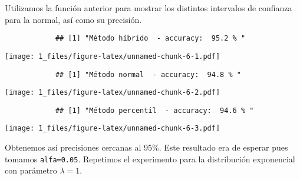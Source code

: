 \documentclass[a4paper]{article}
\begin{document}
\begin{Shaded}
\begin{Highlighting}[]
{{				
				\StringTok{ }\OperatorTok{==}\NormalTok{) }  
				\NormalTok{\}}
			\end{Highlighting}
		\end{Shaded}
		
		Utilizamos la función anterior para mostrar los distintos intervalos de
		confianza para la normal, así como su precisión.
		
		\begin{Shaded}
			\begin{Highlighting}[]
				\NormalTok{(}\NormalTok{)}
				
				\StringTok{ }\NormalTok{(}\NormalTok{, }\NormalTok{, }\NormalTok{)}
				\NormalTok{(}
				\NormalTok{\}}
			\end{Highlighting}
		\end{Shaded}
		
		\begin{verbatim}
			## [1] "Método híbrido  - accuracy:  95.2 % "
		\end{verbatim}
		
		\texttt{[image: 1\_files/figure-latex/unnamed-chunk-6-1.pdf]}
		
		\begin{verbatim}
			## [1] "Método normal  - accuracy:  94.8 % "
		\end{verbatim}
		
		\texttt{[image: 1\_files/figure-latex/unnamed-chunk-6-2.pdf]}
		
		\begin{verbatim}
			## [1] "Método percentil  - accuracy:  94.6 % "
		\end{verbatim}
		
		\texttt{[image: 1\_files/figure-latex/unnamed-chunk-6-3.pdf]}
		
		Obtenemos así precisiones cercanas al 95\%. Este resultado era de
		esperar pues tomamos \texttt{alfa=0.05}. Repetimos el experimento para
		la distribución exponencial con parámetro \(\lambda=1\).
		
\end{document}
